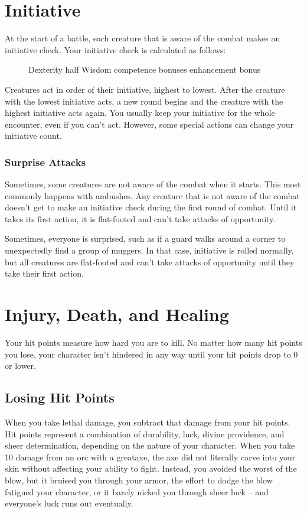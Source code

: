 \section{Initiative}

At the start of a battle, each creature that is aware of the combat makes an initiative check. Your initiative check is calculated as follows:

\begin{figure}[h]
    \centering Dexterity \add half Wisdom \add competence bonuses \add enhancement bonus
\end{figure}

Creatures act in order of their initiative, highest to lowest. After the creature with the lowest initiative acts, a new round begins and the creature with the highest initiative acts again. You usually keep your initiative for the whole encounter, even if you can't act. However, some special actions can change your initiative count.

\subsubsection{Surprise Attacks}
Sometimes, some creatures are not aware of the combat when it starts. This most commonly happens with ambushes. Any creature that is not aware of the combat doesn't get to make an initiative check during the first round of combat. Until it takes its first action, it is flat-footed and can't take attacks of opportunity.

Sometimes, everyone is surprised, such as if a guard walks around a corner to unexpectedly find a group of muggers. In that case, initiative is rolled normally, but all creatures are flat-footed and can't take attacks of opportunity until they take their first action.

\section{Injury, Death, and Healing}
Your hit points measure how hard you are to kill. No matter how many hit points you lose, your character isn't hindered in any way until your hit points drop to 0 or lower.

\subsection{Losing Hit Points}
When you take lethal damage, you subtract that damage from your hit points.
 Hit points represent a combination of durability, luck, divine providence, and sheer determination, depending on the nature of your character. When you take 10 damage from an orc with a greataxe, the axe did not literally carve into your skin without affecting your ability to fight. Instead, you avoided the worst of the blow, but it bruised you through your armor, the effort to dodge the blow fatigued your character, or it barely nicked you through sheer luck -- and everyone's luck runs out eventually.

